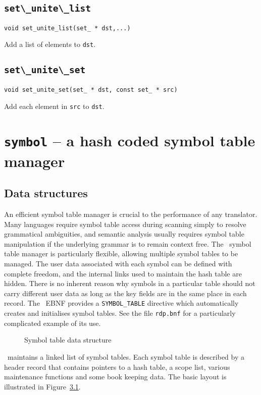 \section{\protect\verb+set\_unite\_list+}
\begin{verbatim}
void set_unite_list(set_ * dst,...)
\end{verbatim}
Add a list of elements to {\tt dst}.

\section{\protect\verb+set\_unite\_set+}
\begin{verbatim}
void set_unite_set(set_ * dst, const set_ * src)
\end{verbatim}
Add each element in {\tt src} to {\tt dst}.

\chapter{{\tt symbol} -- a hash coded symbol table manager}
\label{symbol}
\section{Data structures}
An efficient symbol table manager is crucial to the performance of any translator.
Many languages require symbol table access during
scanning simply to resolve grammatical ambiguities, and semantic
analysis usually requires symbol table manipulation if the underlying grammar is to
remain context free. The \rdp\ symbol table manager is particularly
flexible, allowing multiple symbol tables to be managed. The user data
associated with each symbol can be defined with complete freedom, and
the internal links used to maintain the hash table are hidden.
There is no inherent reason why symbols in
a particular table should not carry different user data as long as the
key fields are in the same place in each record. The \rdp\ EBNF provides
a \verb+SYMBOL_TABLE+ directive which automatically creates and
initialises symbol tables. See the file \verb+rdp.bnf+ for a
particularly complicated example of its use.

\begin{figure}
\begin{center}

\end{center}
\caption{Symbol table data structure}
\label{symbol:structure}
\end{figure}

\rdp\ maintains a linked list of symbol tables. Each symbol table is
described by a header record that contains pointers to a hash table, a
scope list, various maintenance functions and some book keeping data.
The basic layout is illustrated in Figure~\ref{symbol:structure}.

